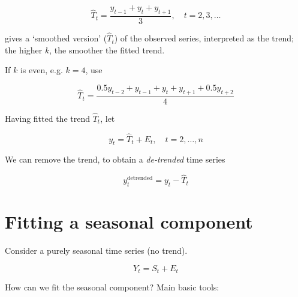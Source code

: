 \documentclass[dvipsnames,12pt]{book}
\begin{document}
\begin{enumerate}
                        \begin{equation}
                            \hat{T}_t = \frac{y_{t-1} + y_t + y_{t+1}}{3}, \quad t = 2,3,\dots
                        \end{equation}
                        
                        \noindent gives a ‘smoothed version’ (\(\hat{T}_t\)) of the observed series, interpreted as the trend; the higher \( k \), the smoother the fitted trend.
                        
                        \noindent If \( k \) is even, e.g. \( k = 4 \), use
                        
                        \begin{equation}
                            \hat{T}_t = \frac{0.5 y_{t-2} + y_{t-1} + y_t + y_{t+1} + 0.5 y_{t+2}}{4}
                        \end{equation}

                        Having fitted the trend \( \hat{T}_t \), let

                        \[
                        y_t = \hat{T}_t + E_t, \quad t = 2, \dots, n
                        \]
                        
                        We can remove the trend, to obtain a \textit{de-trended} time series
                        
                        \begin{equation}
                            y_t^{\text{detrended}} = y_t - \hat{T}_t
                        \end{equation}
                \end{enumerate}

            \section{Fitting a seasonal component}

                Consider a purely seasonal time series (no trend).
                
                \begin{equation}
                    Y_t = S_t + E_t
                \end{equation}

                How can we fit the seasonal component? Main basic tools:
\end{document}
